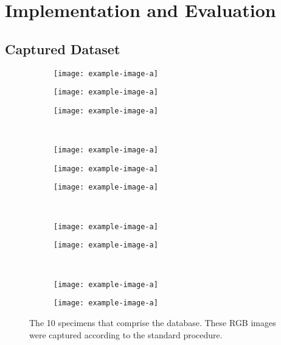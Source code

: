 \chapter{Implementation and Evaluation}

\section{Captured Dataset}


\begin{figure}[H]
\begin{center}
  \begin{subfigure}[t]{.3\linewidth}
    \centering\texttt{[image: example-image-a]}
    \caption{}
  \end{subfigure}
    \begin{subfigure}[t]{.3\linewidth}
    \centering\texttt{[image: example-image-a]}
    \caption{}
  \end{subfigure}
    \begin{subfigure}[t]{.3\linewidth}
    \centering\texttt{[image: example-image-a]}
    \caption{}
  \end{subfigure}
  ~
  \\
  \begin{subfigure}[t]{.3\linewidth}
    \centering\texttt{[image: example-image-a]}
    \caption{}
  \end{subfigure}
    \begin{subfigure}[t]{.3\linewidth}
    \centering\texttt{[image: example-image-a]}
    \caption{}
  \end{subfigure}
    \begin{subfigure}[t]{.3\linewidth}
    \centering\texttt{[image: example-image-a]}
    \caption{}
  \end{subfigure}
  ~
  \\
  \begin{subfigure}[t]{.4\linewidth}
    \centering\texttt{[image: example-image-a]}
    \caption{}
  \end{subfigure}
    \begin{subfigure}[t]{.4\linewidth}
    \centering\texttt{[image: example-image-a]}
    \caption{}
  \end{subfigure}
  ~
  \\
  \begin{subfigure}[t]{.4\linewidth}
    \centering\texttt{[image: example-image-a]}
    \caption{}
  \end{subfigure}
    \begin{subfigure}[t]{.4\linewidth}
    \centering\texttt{[image: example-image-a]}
    \caption{}
  \end{subfigure}
  
    \caption{The 10 specimens that comprise the database. These RGB  images were captured according to the standard procedure.}
  \label{fig:data}
\end{center}
\end{figure}

